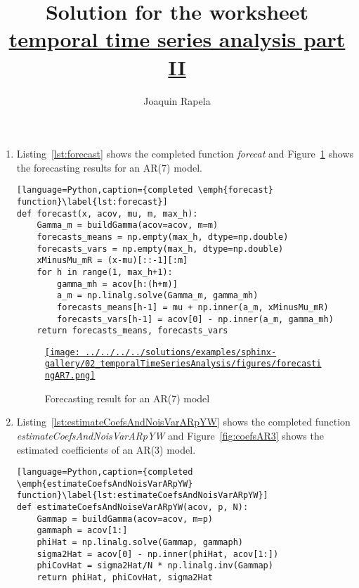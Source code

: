 \documentclass[12pt]{article}
\title{Solution for the worksheet\\
\href{https://github.com/joacorapela/statNeuro2025/blob/master/worksheets/02_temporalTimeSeriesAnalysis/worksheet_temporalTimeSeriesAnalysis2.pdf}{temporal
time series analysis part II}}
\author{Joaquin Rapela}
\begin{document}
\maketitle

\begin{enumerate}

    \item Listing~\ref{lst:forecast} shows the completed function
        \emph{forecat} and Figure~\ref{fig:forecastAR7} shows the forecasting
        results for an AR(7) model.

        \begin{lstlisting}[language=Python,caption={completed \emph{forecast} function}\label{lst:forecast}]
def forecast(x, acov, mu, m, max_h):
    Gamma_m = buildGamma(acov=acov, m=m)
   	forecasts_means = np.empty(max_h, dtype=np.double)
    forecasts_vars = np.empty(max_h, dtype=np.double)
    xMinusMu_mR = (x-mu)[::-1][:m]
    for h in range(1, max_h+1):
       	gamma_mh = acov[h:(h+m)]
        a_m = np.linalg.solve(Gamma_m, gamma_mh)
        forecasts_means[h-1] = mu + np.inner(a_m, xMinusMu_mR)
        forecasts_vars[h-1] = acov[0] - np.inner(a_m, gamma_mh)
    return forecasts_means, forecasts_vars
        \end{lstlisting}

        \begin{figure}
            \begin{center}
                \href{}{\texttt{[image: ../../../../solutions/examples/sphinx-gallery/02\_temporalTimeSeriesAnalysis/figures/forecastingAR7.png]}}
            \end{center}
            \caption{Forecasting result for an AR(7) model}
            \label{fig:forecastAR7}
        \end{figure}

    \item Listing~\ref{lst:estimateCoefsAndNoisVarARpYW} shows the completed
        function \emph{estimateCoefsAndNoisVarARpYW} and
        Figure~\ref{fig:coefsAR3} shows the estimated coefficients of an AR(3)
        model.

        \begin{lstlisting}[language=Python,caption={completed \emph{estimateCoefsAndNoisVarARpYW} function}\label{lst:estimateCoefsAndNoisVarARpYW}]
def estimateCoefsAndNoiseVarARpYW(acov, p, N):
    Gammap = buildGamma(acov=acov, m=p)
    gammaph = acov[1:]
    phiHat = np.linalg.solve(Gammap, gammaph)
    sigma2Hat = acov[0] - np.inner(phiHat, acov[1:])
    phiCovHat = sigma2Hat/N * np.linalg.inv(Gammap)
    return phiHat, phiCovHat, sigma2Hat 
        \end{lstlisting}


\end{enumerate}
\end{document}

